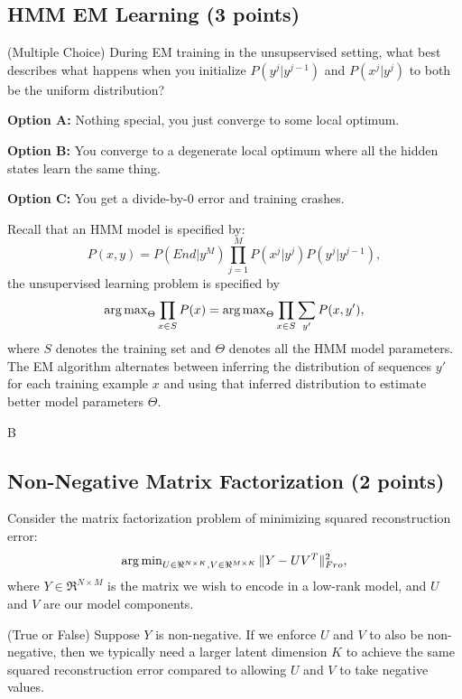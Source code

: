 \smallskip

\subsection{HMM EM Learning (3 points)}

\question
(Multiple Choice)
During EM training in the unsupservised setting, what best describes what happens when you initialize $P(y^j|y^{j-1})$ and $P(x^j|y^j)$ to both be the uniform distribution?

\smallskip

\textbf{Option A:}  Nothing special, you just converge to some local optimum.
\smallskip

\textbf{Option B:}  You converge to a degenerate local optimum where all the hidden states learn the same thing.
\smallskip

\textbf{Option C:}  You get a divide-by-0 error and training crashes.
\smallskip

Recall that an HMM model is specified by:
$$P(x,y) = P(End|y^M)\prod_{j=1}^M P(x^j|y^j)P(y^j|y^{j-1}),$$
the unsupervised learning problem is specified by
$$\operatorname{arg\,max}_{\Theta} \prod_{x\in S} P(x) = \operatorname{arg\,max}_{\Theta} \prod_{x\in S} \sum_{y'} P(x,y'),$$
where $S$ denotes the training set and $\Theta$ denotes all the HMM model parameters. 
The EM algorithm alternates between inferring the distribution of sequences $y'$ for each training example $x$ and using that inferred distribution to estimate better model parameters $\Theta$.  


\begin{solution}
B
\end{solution}



\subsection{Non-Negative Matrix Factorization (2 points)}

Consider the matrix factorization problem of minimizing squared reconstruction error:
$$\operatorname{arg\,min}_{U\in \Re^{N\times K}, V\in \Re^{M\times K}} \|Y - UV^T\|_{Fro}^2,$$
where $Y \in \Re^{N \times M}$ is the matrix we wish to encode in a low-rank model, and $U$ and $V$ are our model components.

\question (True or False) Suppose $Y$ is non-negative.  If we enforce $U$ and $V$ to also be non-negative, then we typically need a larger latent dimension $K$ to achieve the same squared reconstruction error compared to allowing $U$ and $V$ to take negative values.

